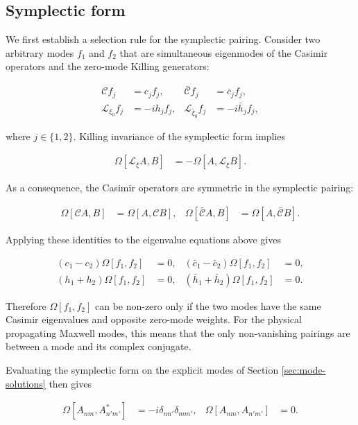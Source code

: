 \subsection{Symplectic form}\label{subsec:symplectic-form}

We first establish a selection rule for the symplectic pairing. Consider two arbitrary modes $f_{1}$ and $f_{2}$ that are simultaneous eigenmodes of the Casimir operators and the zero-mode Killing generators:

\begin{align}
\mathcal{C}f_{j}&=c_{j}f_{j}, &
\bar{\mathcal{C}}f_{j}&=\bar{c}_{j}f_{j}, \\
\mathcal{L}_{\xi_{0}}f_{j}&=-ih_{j}f_{j}, &
\mathcal{L}_{\bar{\xi}_{0}}f_{j}&=-i\bar{h}_{j}f_{j},
\end{align}

where $j\in\{1,2\}$. Killing invariance of the symplectic form implies

\begin{align}
\Omega[\mathcal{L}_{\xi}A,B]&=-\Omega[A,\mathcal{L}_{\xi}B].
\end{align}

As a consequence, the Casimir operators are symmetric in the symplectic pairing:

\begin{align}
\Omega[\mathcal{C}A,B]&=\Omega[A,\mathcal{C}B], &
\Omega[\bar{\mathcal{C}}A,B]&=\Omega[A,\bar{\mathcal{C}}B].
\end{align}

Applying these identities to the eigenvalue equations above gives

\begin{align}
(c_{1}-c_{2})\Omega[f_{1},f_{2}]&=0, &
(\bar{c}_{1}-\bar{c}_{2})\Omega[f_{1},f_{2}]&=0, \\
(h_{1}+h_{2})\Omega[f_{1},f_{2}]&=0, &
(\bar{h}_{1}+\bar{h}_{2})\Omega[f_{1},f_{2}]&=0.
\end{align}

Therefore $\Omega[f_{1},f_{2}]$ can be non-zero only if the two modes have the same Casimir eigenvalues and opposite zero-mode weights. For the physical propagating Maxwell modes, this means that the only non-vanishing pairings are between a mode and its complex conjugate.

Evaluating the symplectic form on the explicit modes of Section \ref{sec:mode-solutions} then gives

\begin{align}
\Omega[A_{nm},A_{n'm'}^{*}]&=-i\delta_{nn'}\delta_{mm'}, &\Omega[A_{nm},A_{n'm'}]&=0.
\end{align}


